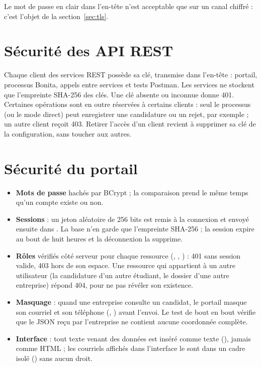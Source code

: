 Le mot de passe en clair dans l'en-tête n'est acceptable que sur un canal chiffré : c'est l'objet de la section~\ref{sec:tls}.

\section{Sécurité des API REST}

Chaque client des services REST possède sa clé, transmise dans l'en-tête  : portail, processus Bonita, appels entre services et tests Postman. Les services ne stockent que l'empreinte SHA-256 des clés. Une clé absente ou inconnue donne 401. Certaines opérations sont en outre réservées à certains clients : seul le processus (ou le mode direct) peut enregistrer une candidature ou un rejet, par exemple ; un autre client reçoit 403. Retirer l'accès d'un client revient à supprimer sa clé de la configuration, sans toucher aux autres.

\section{Sécurité du portail}

\begin{itemize}
  \item \textbf{Mots de passe} hachés par BCrypt ; la comparaison prend le même temps qu'un compte existe ou non.
  \item \textbf{Sessions} : un jeton aléatoire de 256 bits est remis à la connexion et envoyé ensuite dans . La base n'en garde que l'empreinte SHA-256 ; la session expire au bout de huit heures et la déconnexion la supprime.
  \item \textbf{Rôles} vérifiés côté serveur pour chaque ressource (, , ) : 401 sans session valide, 403 hors de son espace. Une ressource qui appartient à un autre utilisateur (la candidature d'un autre étudiant, le dossier d'une autre entreprise) répond 404, pour ne pas révéler son existence.
  \item \textbf{Masquage} : quand une entreprise consulte un candidat, le portail masque son courriel et son téléphone (, ) avant l'envoi. Le test de bout en bout vérifie que le JSON reçu par l'entreprise ne contient aucune coordonnée complète.
  \item \textbf{Interface} : tout texte venant des données est inséré comme texte (), jamais comme HTML ; les courriels affichés dans l'interface le sont dans un cadre isolé () sans aucun droit.
\end{itemize}

